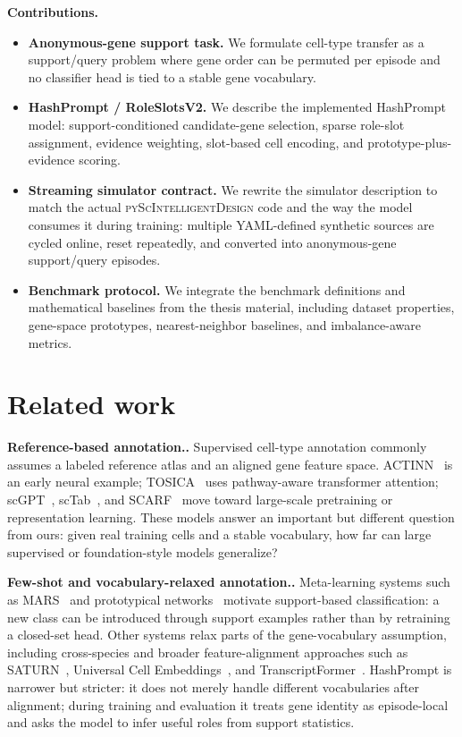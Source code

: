 \documentclass{article}
\newcommand{\myparagraph}[1]{\noindent\textbf{#1.} }
\begin{document}
\myparagraph{Contributions}
\begin{itemize}
    \item \textbf{Anonymous-gene support task.} We formulate cell-type transfer as a support/query problem where gene order can be permuted per episode and no classifier head is tied to a stable gene vocabulary.
    \item \textbf{HashPrompt / RoleSlotsV2.} We describe the implemented HashPrompt model: support-conditioned candidate-gene selection, sparse role-slot assignment, evidence weighting, slot-based cell encoding, and prototype-plus-evidence scoring.
    \item \textbf{Streaming simulator contract.} We rewrite the simulator description to match the actual \textsc{pyScIntelligentDesign} code and the way the model consumes it during training: multiple YAML-defined synthetic sources are cycled online, reset repeatedly, and converted into anonymous-gene support/query episodes.
    \item \textbf{Benchmark protocol.} We integrate the benchmark definitions and mathematical baselines from the thesis material, including dataset properties, gene-space prototypes, nearest-neighbor baselines, and imbalance-aware metrics.
\end{itemize}

\section{Related work}

\myparagraph{Reference-based annotation.}
Supervised cell-type annotation commonly assumes a labeled reference atlas and an aligned gene feature space. ACTINN~\cite{ma2020actinn} is an early neural example; TOSICA~\cite{chen2023transformer} uses pathway-aware transformer attention; scGPT~\cite{cui2024scgpt}, scTab~\cite{fischer2024sctab}, and SCARF~\cite{liu2025scarf} move toward large-scale pretraining or representation learning. These models answer an important but different question from ours: given real training cells and a stable vocabulary, how far can large supervised or foundation-style models generalize?

\myparagraph{Few-shot and vocabulary-relaxed annotation.}
Meta-learning systems such as MARS~\cite{brbic2020mars} and prototypical networks~\cite{snell2017prototypical} motivate support-based classification: a new class can be introduced through support examples rather than by retraining a closed-set head. Other systems relax parts of the gene-vocabulary assumption, including cross-species and broader feature-alignment approaches such as SATURN~\cite{saturn}, Universal Cell Embeddings~\cite{uce}, and TranscriptFormer~\cite{transcriptformer}. HashPrompt is narrower but stricter: it does not merely handle different vocabularies after alignment; during training and evaluation it treats gene identity as episode-local and asks the model to infer useful roles from support statistics.
\end{document}
